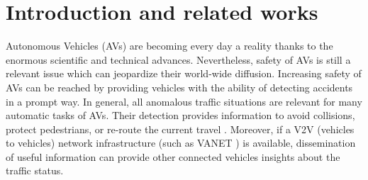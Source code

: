 \section{Introduction and related works}

Autonomous Vehicles (AVs) are becoming every day a reality thanks to the enormous scientific and technical advances. Nevertheless, safety of AVs is still a relevant issue which can jeopardize their world-wide diffusion.
Increasing safety of AVs can be reached by providing vehicles with the ability of detecting accidents in a prompt way.
In general, all anomalous traffic situations are relevant for many automatic tasks of AVs.
Their detection provides information to avoid collisions, protect pedestrians, or re-route the current travel \cite{4298901}.
Moreover, if a V2V (vehicles to vehicles) network infrastructure (such as VANET \cite{fatemidokht2021efficient}) is available, dissemination of useful information can provide other connected vehicles insights about the traffic status. 

